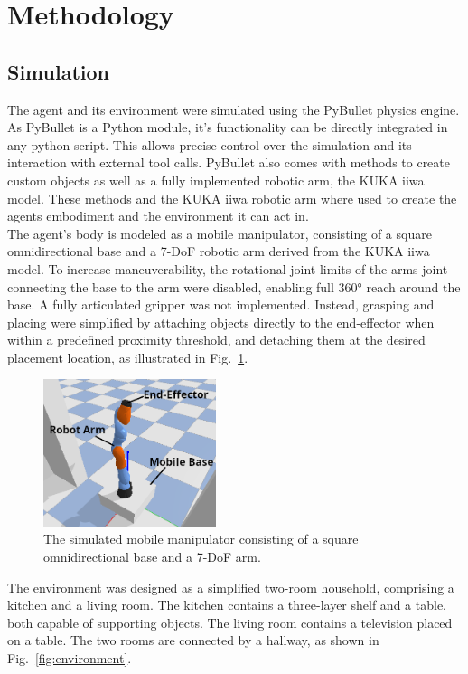 \documentclass[../report.tex]{subfiles}
\begin{document}
\section{Methodology}
\label{sec:methodology}

\subsection{Simulation}
The agent and its environment were simulated using the PyBullet physics engine. As PyBullet is a Python module, it's functionality can be directly integrated in any python script. This allows precise control over the simulation and its interaction with external tool calls. PyBullet also comes with methods to create custom objects as well as a fully implemented robotic arm, the KUKA iiwa model. These methods and the KUKA iiwa robotic arm where used to create the agents embodiment and the environment it can act in. \\
The agent's body is modeled as a mobile manipulator, consisting of a square omnidirectional base and a 7-DoF robotic arm derived from the KUKA iiwa model.
To increase maneuverability, the rotational joint limits of the arms joint connecting the base to the arm were disabled, enabling full 360° reach around the base. A fully articulated gripper was not implemented. Instead, grasping and placing were simplified by attaching objects directly to the end-effector when within a predefined proximity threshold, and detaching them at the desired placement location, as illustrated in Fig.~\ref{fig:agent}.

\begin{figure}[h!]
	\centering
	\includegraphics[width=0.45\textwidth]{figures/agent.png}
	\caption{The simulated mobile manipulator consisting of a square omnidirectional base and a 7-DoF arm.}
	\label{fig:agent}
\end{figure}

The environment was designed as a simplified two-room household, comprising a kitchen and a living room. The kitchen contains a three-layer shelf and a table, both capable of supporting objects. The living room contains a television placed on a table. The two rooms are connected by a hallway, as shown in Fig.~\ref{fig:environment}.
\end{document}
